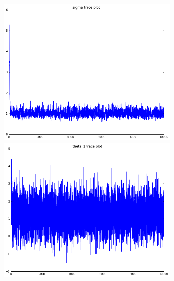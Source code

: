 \documentclass{article}
\begin{document}
		\includegraphics[width = 9cm]{1-c-sigma.png}
		\includegraphics[width = 9cm]{1-c-theta.png}
		
	
\section{}
	\subsection{}
	\subsection{}
	\subsection{}
	\subsection{}

\section{}
	\subsection{}
	\subsection{}
	
	
	
	
	
	
\end{document}
